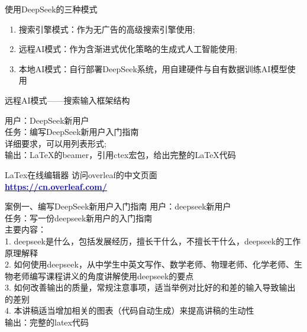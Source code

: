 \documentclass[aspectratio=169]{beamer}
\begin{document}
\begin{frame}[t]{使用DeepSeek的三种模式}
\normalsize
\begin{spacing}{1.5}
\begin{enumerate}
  \item 搜索引擎模式：作为无广告的高级搜索引擎使用;
  \item 远程AI模式：作为含渐进式优化策略的生成式人工智能使用;
  \item 本地AI模式：自行部署DeepSeek系统，用自建硬件与自有数据训练AI模型使用
  \end{enumerate}
\end{spacing}
\end{frame}

\begin{frame}[t]{远程AI模式——搜索输入框架结构}
\normalsize
\begin{spacing}{1.5}
\alert{用户：DeepSeek新用户}\\
\alert{任务：编写DeepSeek新用户入门指南}\\
详细要求，可以用列表形式;\\
\alert{输出：LaTeX的beamer，引用ctex宏包，给出完整的LaTeX代码}
\end{spacing}
\end{frame}

\begin{frame}[t]{LaTex在线编辑器}
\vspace*{0.5cm}
\large{访问overleaf的中文页面 }\\
\vspace*{1.5cm}
\centering
\underline{\Huge \textbf{\href{https://cn.overleaf.com/}{\textcolor{blue}{https://cn.overleaf.com/}}}}

\end{frame}

\begin{frame}[t]{案例一、编写DeepSeek新用户入门指南}
\fontsize{10pt}{14pt}\selectfont
\alert{用户：deepseek新用户}\\
\alert{任务：写一份deepseek新用户的入门指南}\\
主要内容：\\
1. deepseek是什么，包括发展经历，擅长干什么，不擅长干什么，deepseek的工作原理解释\\
2. 如何使用deepseek，从中学生中英文写作、数学老师、物理老师、化学老师、生物老师编写课程讲义的角度讲解使用deepseek的要点\\
3. 如何改善输出的质量，常规注意事项，适当举例对比好的和差的输入导致输出的差别\\
4. 本讲稿适当增加相关的图表（代码自动生成）来提高讲稿的生动性\\
\alert{输出：完整的latex代码}
\end{frame}
\end{document}
